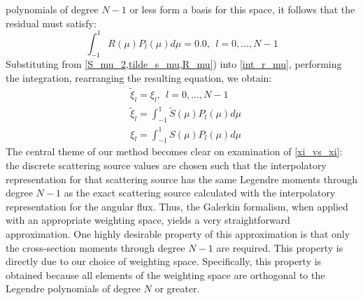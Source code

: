 polynomials of degree $N-1$ or less form a basis for this space, it follows
that the residual must satisfy:
\begin{equation}
\int_{-1}^1 R(\mu) P_l(\mu) d\mu = 0.0,\ \ l=0,\hdots,N-1
\label{int_r_mu}
\end{equation}
Substituting from \cref{S_mu_2,tilde_s_mu,R_mu}) into \cref{int_r_mu}, 
performing the integration, rearranging the resulting equation, we obtain:
\begin{align}
&\tilde{\xi}_l = \xi_l,\ \ l=0,\hdots,N-1 \label{xi_vs_xi}\\
&\tilde{\xi}_l = \int_{-1}^1 \tilde{S}(\mu) P_l(\mu) d\mu\\
&\xi_l = \int_{-1}^1 S(\mu) P_l(\mu) d\mu
\end{align}
The central theme of our method becomes clear on examination of 
\cref{xi_vs_xi}: the discrete scattering source values are chosen such that
the interpolatory representation for that scattering source has the same
Legendre moments through degree $N-1$ as the exact scattering source
calculated with the interpolatory representation for the angular flux. Thus,
the Galerkin formalism, when applied with an appropriate weighting space,
yields a very straightforward approximation. One highly desirable property of
this approximation is that only the cross-section moments through degree $N-1$
are required. This property is directly due to our choice of weighting space.
Specifically, this property is obtained because all elements of the weighting
space are orthogonal to the Legendre polynomials of degree $N$ or greater.


